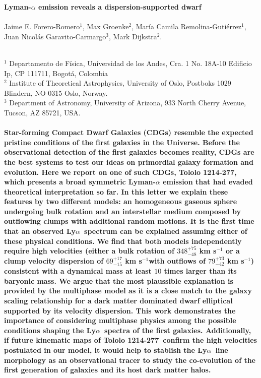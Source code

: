 \documentclass[a4paper, usenatbib, 12pt]{article}
\newcommand{\tol}{Tololo 1214-277}
\newcommand{\lya}{Ly$\alpha$}
\newcommand{\sigmaclump}{$69^{+17}_{-15}$ km s$^{-1}$}
\begin{document}
\pagestyle{empty}
\noindent
\textbf{Lyman-$\alpha$ emission reveals a dispersion-supported dwarf}
\\
\\
Jaime E. Forero-Romero$^{1}$, Max Groenke$^2$, Mar\'ia Camila
Remolina-Guti\'errez$^1$, Juan Nicol\'as
Garavito-Carmargo$^3$, Mark Dijkstra$^2$.
\\
\\
\scriptsize
{$^1$ Departamento de Física, Universidad de los Andes, Cra. 1
  No. 18A-10 Edificio Ip, CP 111711, Bogot\'a, Colombia 
\\
$^2$ Institute of Theoretical Astrophysics, University of Oslo,
Postboks 1029 Blindern, NO-0315 Oslo, Norway.
\\
$^3$ Department of Astronomy, University of Arizona, 933 North Cherry
Avenue, Tucson, AZ 85721, USA. 
\normalsize
\\
\\
\textbf{
  Star-forming Compact Dwarf Galaxies (CDGs) resemble the expected
  pristine conditions of the first galaxies in the Universe.    
Before the observational detection of the first galaxies becomes
reality, CDGs are the best systems to test our ideas on primordial
galaxy formation and evolution.    
Here we report on one of such CDGs, \tol, which presents
a broad symmetric Lyman-$\alpha$ emission that had evaded theoretical
interpretation so far. 
In this letter we explain these features by two different models: an
homogeneous gaseous sphere undergoing bulk rotation and an interstellar
medium composed by outflowing clumps with additional random motions.
It is the first time that an observed \lya\ spectrum can be explained
assuming either of these physical conditions.
We find that both models independently require high velocities
(either a bulk rotation of $348^{+75}_{-48}$ km s$^{-1}$ or a clump velocity
dispersion of \sigmaclump with outflows of
$79^{+73}_{-42}$ km s$^{-1}$) consistent with a dynamical mass at
least $10$ times larger than its baryonic mass.  
We argue that the most plaussible explanation is provided by the
multiphase model as it is a close match to the galaxy scaling relationship
for a dark matter dominated dwarf elliptical supported by its
velocity dispersion. 
This work demonstrates the importance of considering multiphase
physics among the possible conditions shaping the \lya\ spectra of the
first galaxies.   Additionally, if future kinematic maps of
\tol\ confirm the high velocities postulated in our model, it would
help to stablish the \lya\ line morphology as an observational tracer to
study the co-evolution of the first generation of galaxies and its
host dark matter halos. 
}  



}
\end{document}

